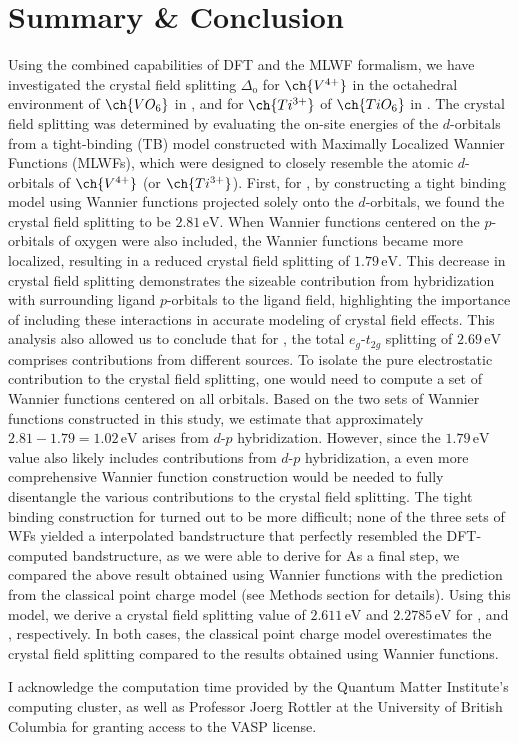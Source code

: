 \documentclass[%
 reprint,
 amsmath,amssymb,
 aps,
]{revtex4-2}
\begin{document}
\section{Summary \& Conclusion}
Using the combined capabilities of DFT and the MLWF formalism, we have investigated the crystal field splitting \(\Delta_{\text{o}}\) for \(\ch{V^{4+}}\) in the octahedral environment of \(\ch{VO_6}\) in , and for \(\ch{Ti^{3+}}\) of  \(\ch{TiO_6}\) in . The crystal field splitting was determined by evaluating the on-site energies of the \(d\)-orbitals from a tight-binding (TB) model constructed with Maximally Localized Wannier Functions (MLWFs), which were designed to closely resemble the atomic \(d\)-orbitals of \(\ch{V^{4+}}\) (or \(\ch{Ti^{3+}}\)). 
First, for  ,  by constructing a tight binding model using Wannier functions projected solely onto the \(d\)-orbitals, we found the crystal field splitting to be \(2.81 \, \text{eV}\). When Wannier functions centered on the \(p\)-orbitals of oxygen were also included, the Wannier functions became more localized, resulting in a reduced crystal field splitting of \(1.79 \, \text{eV}\).  This decrease in crystal field splitting demonstrates the sizeable contribution from hybridization with surrounding ligand \(p\)-orbitals to the ligand field, highlighting the importance of including these interactions in accurate modeling of crystal field effects. 
This analysis also allowed us to conclude that for , the total \(e_g\)-\(t_{2g}\) splitting of \(2.69 \, \text{eV}\) comprises contributions from different sources. To isolate the pure electrostatic contribution to the crystal field splitting, one would need to compute a set of Wannier functions centered on all orbitals. Based on the two sets of Wannier functions constructed in this study, we estimate that approximately \(2.81 - 1.79 = 1.02 \, \text{eV}\) arises from \(d\)-\(p\) hybridization. However, since the \(1.79 \, \text{eV}\) value also likely includes contributions from \(d\)-\(p\) hybridization, a even more comprehensive Wannier function construction would be needed to fully disentangle the various contributions to the crystal field splitting.
The tight binding construction for   turned out to be more difficult; none of the three sets of WFs yielded a interpolated bandstructure that perfectly resembled the DFT-computed bandstructure, as we were able to derive for 
As a final step, we compared the above result obtained using Wannier functions with the prediction from the classical point charge model (see Methods section for details). Using this model, we derive a crystal field splitting value of \(2.611  \, \text{eV}\) and \(2.2785 \, \text{eV}\) for , and , respectively. In both cases, the classical point charge model overestimates the crystal field splitting compared to the results obtained using Wannier functions. 
\begin{acknowledgments}
I acknowledge the computation time provided by the Quantum Matter Institute's computing cluster, as well as Professor Joerg Rottler at the University of British Columbia for granting access to the VASP license.
\end{acknowledgments}
\end{document}
